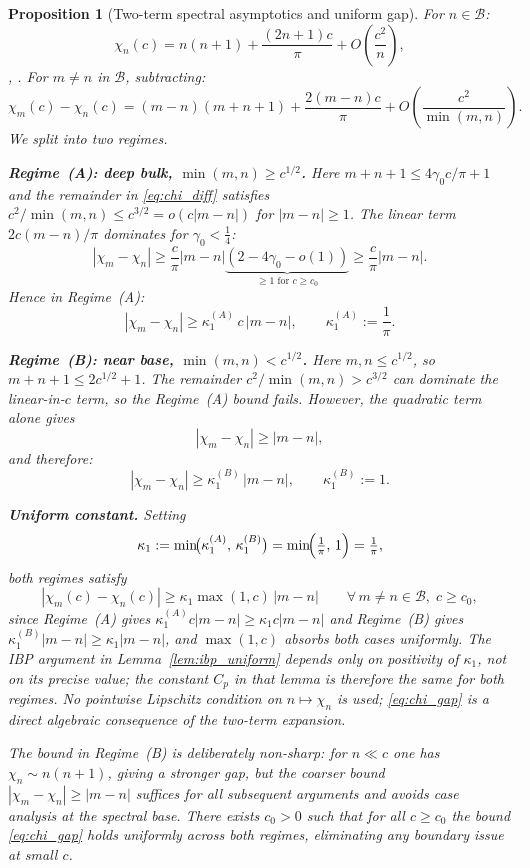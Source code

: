 \documentclass[12pt,a4paper]{amsart}
\newtheorem{proposition}[theorem]{Proposition}
\theoremstyle{definition}
\begin{document}
\begin{proposition}[Two-term spectral asymptotics and uniform gap]%
\label{prop:spectral_gap}
For $n\in\mathcal{B}$:
\[
  \chi_n(c) = n(n+1) + \frac{(2n+1)c}{\pi}
              + O\!\left(\frac{c^2}{n}\right),
\]
\cite[Section~2.5]{OsipovRokhlinXiao}, \cite[Introduction]{PaperIV}.
For $m\ne n$ in $\mathcal{B}$, subtracting:
\begin{equation}\label{eq:chi_diff}
  \chi_m(c)-\chi_n(c)
  =(m-n)(m+n+1)+\frac{2(m-n)c}{\pi}
   +O\!\left(\frac{c^2}{\min(m,n)}\right).
\end{equation}
We split into two regimes.

\smallskip
\noindent\textbf{Regime~(A): deep bulk, $\min(m,n)\ge c^{1/2}$.}
Here $m+n+1\le 4\gamma_0 c/\pi+1$ and the remainder in
\eqref{eq:chi_diff} satisfies
$c^2/\min(m,n)\le c^{3/2}=o(c|m-n|)$ for $|m-n|\ge 1$.
The linear term $2c(m-n)/\pi$ dominates for $\gamma_0<\tfrac{1}{4}$:
\[
  |\chi_m-\chi_n|
  \ge\frac{c}{\pi}|m-n|
     \underbrace{(2-4\gamma_0-o(1))}_{\ge 1\text{ for }c\ge c_0}
  \ge\frac{c}{\pi}|m-n|.
\]
Hence in Regime~(A):
\[
  |\chi_m-\chi_n|\ge\kappa_1^{(A)}\,c\,|m-n|,
  \qquad\kappa_1^{(A)}:=\frac{1}{\pi}.
\]

\noindent\textbf{Regime~(B): near base, $\min(m,n)<c^{1/2}$.}
Here $m,n\le c^{1/2}$, so $m+n+1\le 2c^{1/2}+1$. The remainder
$c^2/\min(m,n)>c^{3/2}$ can dominate the linear-in-$c$ term, so
the Regime~(A) bound fails. However, the quadratic term alone gives
\[
  |\chi_m-\chi_n|\ge|m-n|,
\]
and therefore:
\[
  |\chi_m-\chi_n|\ge\kappa_1^{(B)}\,|m-n|,
  \qquad\kappa_1^{(B)}:=1.
\]

\noindent\textbf{Uniform constant.}
Setting
\[
  \kappa_1:=\min\!\bigl(\kappa_1^{(A)},\,\kappa_1^{(B)}\bigr)
           =\min\!\Bigl(\tfrac{1}{\pi},\,1\Bigr)
           =\tfrac{1}{\pi},
\]
both regimes satisfy
\begin{equation}\label{eq:chi_gap}
  |\chi_m(c)-\chi_n(c)|\ge\kappa_1\max(1,c)\,|m-n|
  \qquad\forall\,m\ne n\in\mathcal{B},\;c\ge c_0,
\end{equation}
since Regime~(A) gives $\kappa_1^{(A)}c|m-n|\ge\kappa_1 c|m-n|$
and Regime~(B) gives $\kappa_1^{(B)}|m-n|\ge\kappa_1|m-n|$,
and $\max(1,c)$ absorbs both cases uniformly.
The IBP argument in Lemma~\ref{lem:ibp_uniform} depends only on
\emph{positivity} of $\kappa_1$, not on its precise value; the
constant $C_p$ in that lemma is therefore the same for both regimes.
No pointwise Lipschitz condition on $n\mapsto\chi_n$ is used;
\eqref{eq:chi_gap} is a direct algebraic consequence of the two-term
expansion.

The bound in Regime~(B) is deliberately non-sharp: for $n\ll c$ one
has $\chi_n\sim n(n+1)$, giving a stronger gap, but the coarser bound
$|\chi_m-\chi_n|\ge|m-n|$ suffices for all subsequent arguments and
avoids case analysis at the spectral base.
There exists $c_0>0$ such that for all $c\ge c_0$ the bound
\eqref{eq:chi_gap} holds uniformly across both regimes, eliminating
any boundary issue at small $c$.
\end{proposition}
\end{document}
